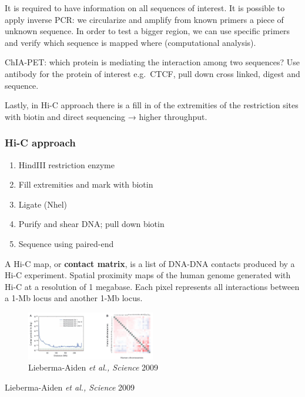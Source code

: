 It is required to have information on all sequences of interest. It is possible to apply inverse PCR: we circularize and amplify from known primers a piece of unknown sequence. In order to test a bigger region, we can use specific primers and verify which sequence is mapped where (computational analysis).

ChIA-PET: which protein is mediating the interaction among two sequences? Use antibody for the protein of interest e.g.~CTCF, pull down cross linked, digest and sequence.

Lastly, in Hi-C approach there is a fill in of the extremities of the restriction sites with biotin and direct sequencing → higher throughput.

\hypertarget{hi-c-approach}{%
\subsubsection{Hi-C approach}\label{hi-c-approach}}

\begin{enumerate}
\def\labelenumi{\arabic{enumi}.}
\tightlist
\item
  HindIII restriction enzyme
\item
  Fill extremities and mark with biotin
\item
  Ligate (Nhel)
\item
  Purify and shear DNA; pull down biotin
\item
  Sequence using paired-end
\end{enumerate}

A Hi-C map, or \textbf{contact matrix}, is a list of DNA-DNA contacts produced by a Hi-C experiment. Spatial proximity maps of the human genome generated with Hi-C at a resolution of 1 megabase. Each pixel represents all interactions between a 1-Mb locus and another 1-Mb locus.

\begin{figure}
\centering
\includegraphics[width=0.5\textwidth]{../_resources/Screenshot_2022-10-25_at_11-47-30.png}
\caption{Lieberma-Aiden \emph{et al., Science} 2009}
\end{figure}

Lieberma-Aiden \emph{et al., Science} 2009

